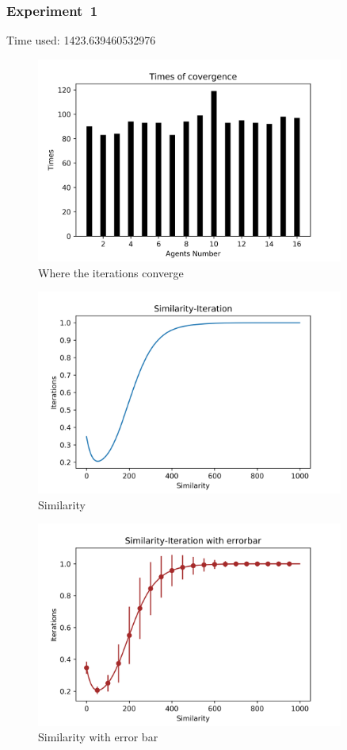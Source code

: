 \documentclass[a4paper,12pt]{article}
\begin{document}
    \subsubsection*{Experiment~1}
    Time used: 1423.639460532976
    \begin{figure}[H]
    	\centering
    	\includegraphics[width=0.9\textwidth]{agt50_4_1000_1500}
    	\caption{Where the iterations converge}\label{agt50_4_1000_1500}
    \end{figure}
    \begin{figure}[H]
    	\centering
    	\includegraphics[width=0.9\textwidth]{Sim50_4_1000_1500}
    	\caption{Similarity}\label{Sim50_4_1000_1500}
    \end{figure}
    \begin{figure}[H]
    	\centering
    	\includegraphics[width=0.9\textwidth]{SimErr50_4_1000_1500}
    	\caption{Similarity with error bar}\label{SimErr50_4_1000_1500}
    \end{figure}
\end{document}
